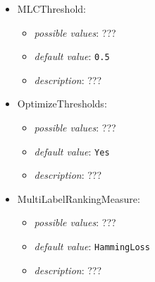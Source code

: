\documentclass{article}
\begin{document}
\begin{itemize}
    \item MLCThreshold:
           \begin{itemize}
                \item \emph{possible values}: ???
                \item \emph{default value}: \texttt{0.5}
                \item \emph{description}: ???
           \end{itemize}
    \item OptimizeThresholds:
           \begin{itemize}
                \item \emph{possible values}: ???
                \item \emph{default value}: \texttt{Yes}
                \item \emph{description}: ???
           \end{itemize}
    \item MultiLabelRankingMeasure:
           \begin{itemize}
                \item \emph{possible values}: ???
                \item \emph{default value}: \texttt{HammingLoss}
                \item \emph{description}: ???
           \end{itemize}
\end{itemize}
\end{document}
